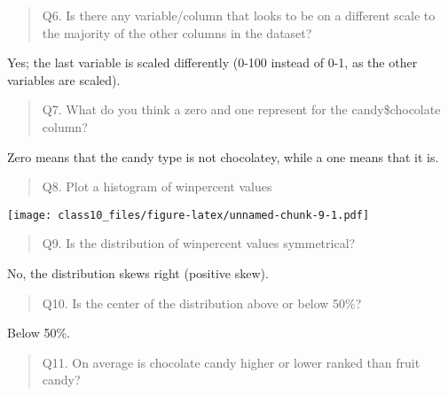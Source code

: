 \documentclass[
]{article}
\newenvironment{Shaded}{\begin{snugshade}}{\end{snugshade}}
\newcommand{\FunctionTok}[1]{\textcolor[rgb]{0.00,0.00,0.00}{#1}}
\newcommand{\NormalTok}[1]{#1}
\newcommand{\SpecialCharTok}[1]{\textcolor[rgb]{0.00,0.00,0.00}{#1}}
\begin{document}
\begin{quote}
Q6. Is there any variable/column that looks to be on a different scale
to the majority of the other columns in the dataset?
\end{quote}

Yes; the last variable is scaled differently (0-100 instead of 0-1, as
the other variables are scaled).

\begin{quote}
Q7. What do you think a zero and one represent for the candy\$chocolate
column?
\end{quote}

Zero means that the candy type is not chocolatey, while a one means that
it is.

\begin{quote}
Q8. Plot a histogram of winpercent values
\end{quote}

\begin{Shaded}
\end{Shaded}

\texttt{[image: class10\_files/figure-latex/unnamed-chunk-9-1.pdf]}

\begin{quote}
Q9. Is the distribution of winpercent values symmetrical?
\end{quote}

No, the distribution skews right (positive skew).

\begin{quote}
Q10. Is the center of the distribution above or below 50\%?
\end{quote}

Below 50\%.

\begin{quote}
Q11. On average is chocolate candy higher or lower ranked than fruit
candy?
\end{quote}

\begin{Shaded}
\end{Shaded}
\end{document}
